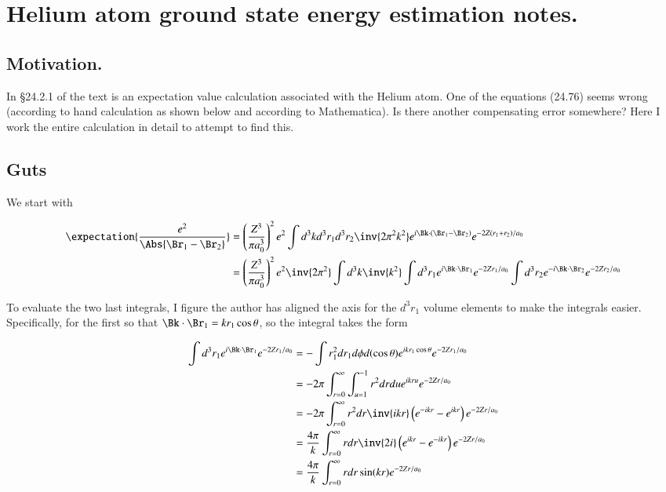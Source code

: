 %
%

\chapter{Helium atom ground state energy estimation notes.}
\label{chap:variationalHelium}
{}
\date{Sept 29, 2011}

\beginArtNoToc

\section{Motivation.}

In \S 24.2.1 of the text \cite{desai2009quantum} is an expectation value calculation associated with the Helium atom.  One of the equations (24.76) seems wrong (according to hand calculation as shown below and according to Mathematica).  Is there another compensating error somewhere?  Here I work the entire calculation in detail to attempt to find this.

\section{Guts}

We start with

\begin{align*}
\expectation{\frac{e^2}{\Abs{\Br_1 - \Br_2}}}
&=
\left( \frac{Z^3}{\pi a_0^3}\right)^2 e^2
\int d^3 k d^3 r_1 d^3 r_2 \inv{2 \pi^2 k^2} e^{i \Bk \cdot (\Br_1 - \Br_2) } e^{ -2 Z (r_1 + r_2)/a_0} \\
&= 
\left( \frac{Z^3}{\pi a_0^3}\right)^2 e^2
\inv{2 \pi^2} 
\int d^3 k \inv{k^2}
\int d^3 r_1 
e^{i \Bk \cdot \Br_1 } e^{ -2 Z r_1 /a_0} 
\int 
d^3 r_2 
e^{-i \Bk \cdot \Br_2 } e^{ -2 Z r_2/a_0} \\
\end{align*}

To evaluate the two last integrals, I figure the author has aligned the axis for the $d^3 r_1$ volume elements to make the integrals easier.  Specifically, for the first so that $\Bk \cdot \Br_1 = k r_1 \cos\theta$, so the integral takes the form

\begin{align*}
\int 
d^3 r_1 
e^{i \Bk \cdot \Br_1 } e^{ -2 Z r_1 /a_0} 
&=
-\int 
r_1^2 d r_1 d\phi d(\cos\theta)
e^{i k r_1 \cos\theta } e^{ -2 Z r_1 /a_0} \\
&=
- 2 \pi \int_{r=0}^\infty \int_{u=1}^{-1}
r^2 dr du
e^{i k r u } e^{ -2 Z r /a_0} \\
&=
- 2 \pi \int_{r=0}^\infty 
r^2 dr 
\inv{i k r} \left( e^{-i k r } - e^{i k r} \right) e^{ -2 Z r /a_0} \\
&=
\frac{4 \pi}{k } \int_{r=0}^\infty 
r dr 
\inv{2i} \left( e^{i k r } - e^{-i k r} \right) e^{ -2 Z r /a_0} \\
&=
\frac{4 \pi}{k } \int_{r=0}^\infty r dr \sin(k r) e^{ -2 Z r /a_0} \\
\end{align*}

